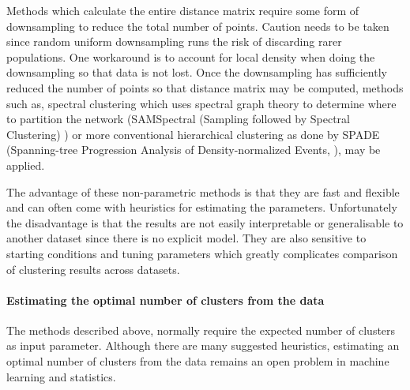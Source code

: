Methods which calculate the entire distance matrix require some form of downsampling to reduce the total number of points.
Caution needs to be taken since random uniform downsampling runs the risk of discarding rarer populations.
One workaround is to account for local density when doing the downsampling so that data is not lost.
Once the downsampling has sufficiently reduced the number of points so that distance matrix may be computed,
methods such as, spectral clustering which uses spectral graph theory to determine where to partition the network
(SAMSpectral (Sampling followed by Spectral Clustering) \citet{Zare:2010cw}) or more conventional hierarchical clustering
as done by SPADE (Spanning-tree Progression Analysis of Density-normalized Events, \cite{Simonds:2011jh}), may be applied.

The advantage of these non-parametric methods is that they are fast and flexible and can often come with heuristics for estimating the parameters.
Unfortunately the disadvantage is that the results are not easily interpretable or generalisable to another dataset since there is no explicit model.
They are also sensitive to starting conditions and tuning parameters which greatly complicates comparison of clustering results across datasets.


\paragraph{Estimating the optimal number of clusters from the data}

The methods described above, normally require the expected number of clusters as input parameter.
Although there are many suggested heuristics,
estimating an optimal number of clusters from the data remains an open problem in machine learning and statistics.


